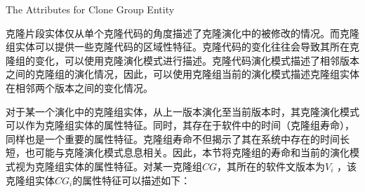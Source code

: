 {The Attributes for Clone Group Entity}

克隆片段实体仅从单个克隆代码的角度描述了克隆演化中的被修改的情况。而克隆组实体可以提供一些克隆代码的区域性特征。克隆代码的变化往往会导致其所在克隆组的变化，可以使用克隆演化模式进行描述。克隆代码演化模式描述了相邻版本之间的克隆组的演化情况，因此，可以使用克隆组当前的演化模式描述克隆组实体在相邻两个版本之间的变化情况。

对于某一个演化中的克隆组实体，从上一版本演化至当前版本时，其克隆演化模式可以作为克隆组实体的属性特征。同时，其存在于软件中的时间（克隆组寿命），同样也是一个重要的属性特征。克隆组寿命不但揭示了其在系统中存在的时间长短，也可能与克隆演化模式息息相关。因此，本节将克隆组的寿命和当前的演化模式视为克隆组实体的属性特征。对某一克隆组$CG$，其所在的软件文版本为$V_i $ ，该克隆组实体{$CG_i$}的属性特征可以描述如下：

